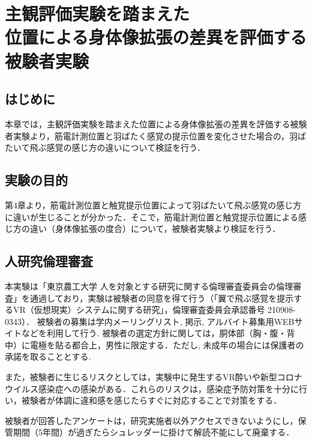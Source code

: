 \chapter[主観評価実験を踏まえた位置による身体像拡張の差異を評価する被験者実験]%
        {主観評価実験を踏まえた\\位置による身体像拡張の差異を評価する\\被験者実験}

\section{はじめに}
        本章では，主観評価実験を踏まえた位置による身体像拡張の差異を評価する被験者実験より，筋電計測位置と羽ばたく感覚の提示位置を変化させた場合の，羽ばたいて飛ぶ感覚の感じ方の違いについて検証を行う．

\section{実験の目的}
        第4章より，筋電計測位置と触覚提示位置によって羽ばたいて飛ぶ感覚の感じ方に違いが生じることが分かった．そこで，筋電計測位置と触覚提示位置による感じ方の違い（身体像拡張の度合）について，被験者実験より検証を行う．
        
\section{人研究倫理審査}
        本実験は「東京農工大学 人を対象とする研究に関する倫理審査委員会の倫理審査」を通過しており，実験は被験者の同意を得て行う（「翼で飛ぶ感覚を提示するVR（仮想現実）システムに関する研究」，倫理審査委員会承認番号 210908-0343）．
        被験者の募集は学内メーリングリスト, 掲示, アルバイト募集用WEBサイトなどを利用して行う. 被験者の選定方針に関しては，胴体部（胸・腹・背中）に電極を貼る都合上，男性に限定する．ただし, 未成年の場合には保護者の承諾を取ることとする. 

        また，被験者に生じるリスクとしては，実験中に発生するVR酔いや新型コロナウイルス感染症への感染がある．これらのリスクは，感染症予防対策を十分に行い，被験者が体調に違和感を感じたらすぐに対応することで対策をする．

        被験者が回答したアンケートは，研究実施者以外アクセスできないようにし，保管期間（5年間）が過ぎたらシュレッダーに掛けて解読不能にして廃棄する．
        

